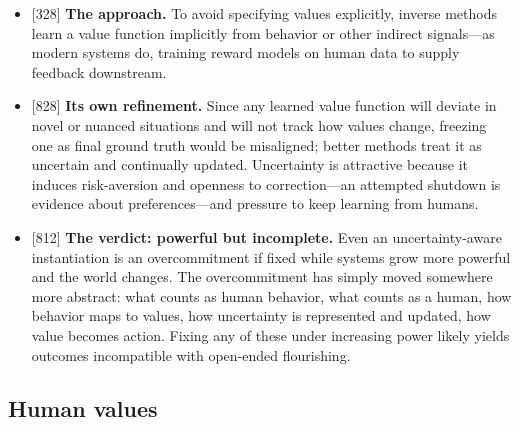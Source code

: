 \documentclass[11pt]{article}
\newcommand{\ct}[1]{{\footnotesize\color{black!55}[#1]}\hspace{1pt}}
\begin{document}
\begin{itemize}
  \item \ct{328} \textbf{The approach.} To avoid specifying values explicitly, inverse methods learn a value function implicitly from behavior or other indirect signals---as modern systems do, training reward models on human data to supply feedback downstream.
  \item \ct{828} \textbf{Its own refinement.} Since any learned value function will deviate in novel or nuanced situations and will not track how values change, freezing one as final ground truth would be misaligned; better methods treat it as uncertain and continually updated. Uncertainty is attractive because it induces risk-aversion and openness to correction---an attempted shutdown is evidence about preferences---and pressure to keep learning from humans.
  \item \ct{812} \textbf{The verdict: powerful but incomplete.} Even an uncertainty-aware instantiation is an overcommitment if fixed while systems grow more powerful and the world changes. The overcommitment has simply moved somewhere more abstract: what counts as human behavior, what counts as a human, how behavior maps to values, how uncertainty is represented and updated, how value becomes action. Fixing any of these under increasing power likely yields outcomes incompatible with open-ended flourishing.
\end{itemize}

\subsection{Human values}
\end{document}
